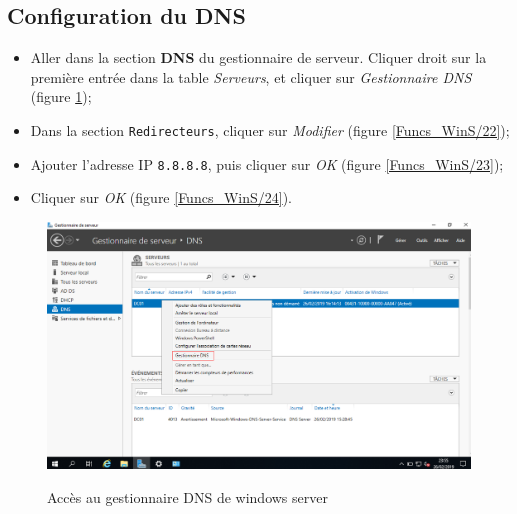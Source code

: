 \subsection{Configuration du DNS}

\begin{itemize}
    \item Aller dans la section \textbf{DNS} du gestionnaire de serveur. Cliquer droit sur la première entrée dans la table \textit{Serveurs}, et cliquer sur \textit{Gestionnaire DNS} (figure \ref{Funcs_WinS/21});
    \item Dans la section \texttt{Redirecteurs}, cliquer sur \textit{Modifier} (figure \ref{Funcs_WinS/22});
    \item Ajouter l'adresse IP \texttt{8.8.8.8}, puis cliquer sur \textit{OK} (figure \ref{Funcs_WinS/23});
    \item Cliquer sur \textit{OK} (figure \ref{Funcs_WinS/24}).
\end{itemize}

\begin{figure}[h!]
	\begin{center}
		\caption{Accès au gestionnaire DNS de windows server}
		\includegraphics[scale=0.5]{WS_Screenshots/49.png}
		\label{Funcs_WinS/21}
	\end{center}
\end{figure}
\FloatBarrier 

